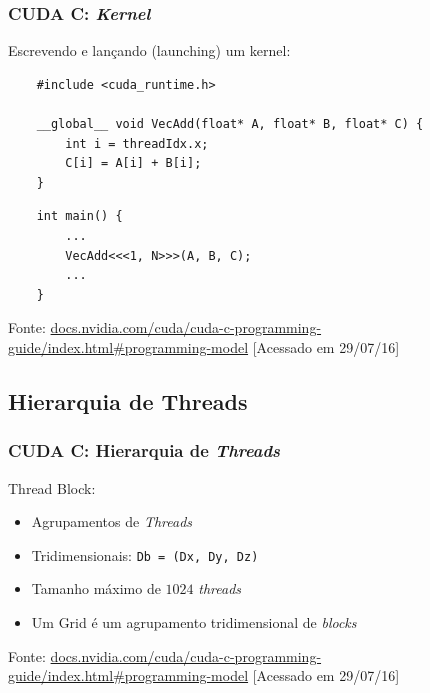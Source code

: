 \documentclass[10pt, compress]{beamer}
\begin{document}
\begin{frame}[fragile]
    \frametitle{CUDA C: \textit{Kernel}}
    Escrevendo e \alert{lançando} (launching) um \alert{kernel}:
    \begin{lstlisting}
    #include <cuda_runtime.h>

    __global__ void VecAdd(float* A, float* B, float* C) {
        int i = threadIdx.x;
        C[i] = A[i] + B[i];
    }
    \end{lstlisting}
    \pause
    \begin{lstlisting}
    int main() {
        ...
        VecAdd<<<1, N>>>(A, B, C);
        ...
    }
    \end{lstlisting}
    \vfill

    \begin{center}
        \tiny{Fonte: \url{docs.nvidia.com/cuda/cuda-c-programming-guide/index.html\#programming-model} [Acessado em 29/07/16]}
    \end{center}
\end{frame}

\subsection{Hierarquia de Threads}

\begin{frame}
    \frametitle{CUDA C: Hierarquia de \textit{Threads}}
    \alert{Thread Block}:
    \begin{itemize}
        \item Agrupamentos de \textit{Threads}
            \pause
        \item \alert{Tridimensionais}: \texttt{\footnotesize{Db = (Dx, Dy, Dz)}}
            \pause
        \item Tamanho \alert{máximo} de $1024$ \textit{threads}
            \pause
        \item Um \alert{Grid} é um agrupamento tridimensional de \textit{blocks}
    \end{itemize}

    \vfill

    \begin{center}
        \tiny{Fonte: \url{docs.nvidia.com/cuda/cuda-c-programming-guide/index.html\#programming-model} [Acessado em 29/07/16]}
    \end{center}
\end{frame}
\end{document}
